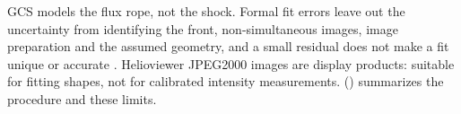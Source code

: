 \begin{caution}
  GCS models the flux rope, not the shock. Formal fit errors leave out the uncertainty from
  identifying the front, non-simultaneous images, image preparation and the assumed geometry,
  and a small residual does not make a fit unique or accurate \parencite{verbeke2023}. Helioviewer
  JPEG2000 images are display products: suitable for fitting shapes, not for calibrated
  intensity measurements.  ()
  summarizes the procedure and these limits.
\end{caution}
